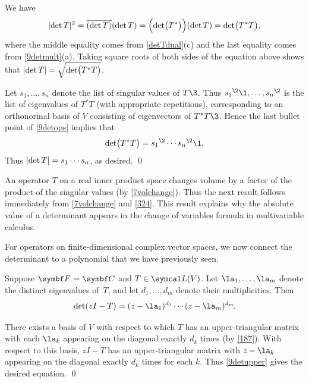 \proof
We have
\[
\abs{ \det T }^2 = \overline{(\det T)} (\det T) = \paren[\Big]{\det \paren[\big]{T^*}}(\det T) = \det\paren[\big]{T^* T},
\]
where the middle equality comes from \ref{detTdual}(c)  and the last equality comes from \ref{9detmult}(a). Taking square roots of both sides of the equation above shows that $\abs{\det T} = \sqrt{\det\paren[\big]{T^*T}}$.

Let $s_1, \ldots, s_n$ denote the list of singular values of $T\3$. Thus ${s_1}^{\2}\1, \ldots, {s_n}^{\2}$ is the list of eigenvalues of $T^*T$ (with appropriate repetitions), corresponding to an orthonormal basis of $V$ consisting of eigenvectors of $T^*T\3$.  Hence the last bullet point of \ref{9detops} implies that
\vspace{-.1in}
\[
\det \paren[\big]{ T^* T } = {s_1}^{\2} \cdots {s_n}^{\2}\1.
\vspace{-.02in} %
\]
Thus $\abs{\det T} = s_1 \cdots s_n$, as desired.
\qed

\pagebreak[3]

An operator $T$ on a real inner product space changes volume by a factor of the product of the singular values (by \ref{7volchange}). Thus the next result follows immediately from \ref{7volchange} and \ref{324}. This result explains why the absolute value of a determinant appears in the change of variables formula in multivariable calculus.


For operators on finite-dimensional complex vector spaces, we now connect the determinant to a polynomial that we have previously seen.

{Suppose $\F{} = \C{}$ and $T \in \L(V)$. Let $\la_1, \ldots, \la_m$ denote the distinct eigenvalues of~$T$, and let
$d_1, \ldots, d_m$ denote their multiplicities.
Then
\[
\det(zI - T) = (z - \la_1)^{d_1} \dotsm (z - \la_m)^{d_m}\!.
\]}

\proof
 There exists a basis of $V$ with respect to which $T$ has an upper-triangular matrix with each $\la_k$ appearing on the diagonal exactly $d_k$ times (by \ref{187}). With respect to this basis, $zI - T$ has an upper-triangular matrix with $z - \la_k$ appearing on the diagonal exactly $d_k$ times for each $k$. Thus \ref{9detupper} gives the desired equation.
\qed

